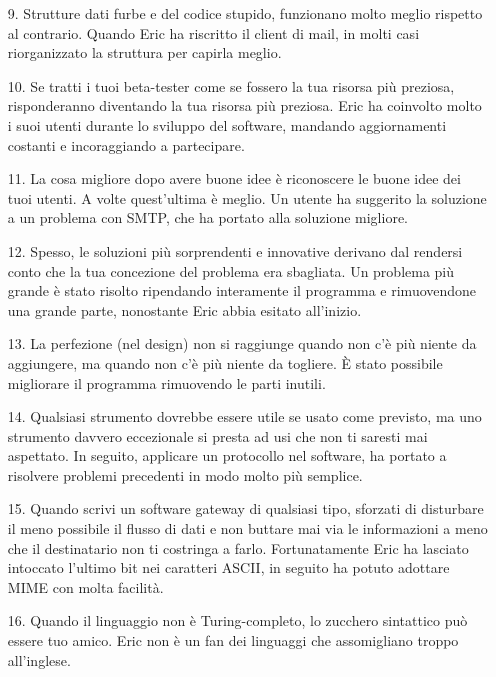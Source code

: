 \documentclass[a4paper,12pt,titlepage,oneside]{book}
\begin{document}
\begin{itemize}
    \item[9.] Strutture dati furbe e del codice stupido, funzionano molto meglio rispetto al contrario.
    Quando Eric ha riscritto il client di mail, in molti casi riorganizzato la struttura per capirla meglio.

    \item[10.] Se tratti i tuoi beta-tester come se fossero la tua risorsa più preziosa, risponderanno diventando la tua risorsa più preziosa.
    Eric ha coinvolto molto i suoi utenti durante lo sviluppo del software, mandando aggiornamenti costanti e incoraggiando a partecipare.

    \item[11.] La cosa migliore dopo avere buone idee è riconoscere le buone idee dei tuoi utenti. A volte quest'ultima è meglio.
    Un utente ha suggerito la soluzione a un problema con SMTP, che ha portato alla soluzione migliore.

    \item[12.] Spesso, le soluzioni più sorprendenti e innovative derivano dal rendersi conto che la tua concezione del problema era sbagliata.
    Un problema più grande è stato risolto ripendando interamente il programma e rimuovendone una grande parte, nonostante Eric abbia esitato all'inizio.

    \item[13.] La perfezione (nel design) non si raggiunge quando non c'è più niente da aggiungere, ma quando non c'è più niente da togliere.
    È stato possibile migliorare il programma rimuovendo le parti inutili.

    \item[14.] Qualsiasi strumento dovrebbe essere utile se usato come previsto, ma uno strumento davvero eccezionale si presta ad usi che non ti saresti mai aspettato.
    In seguito, applicare un protocollo nel software, ha portato a risolvere problemi precedenti in modo molto più semplice.

    \item[15.] Quando scrivi un software gateway di qualsiasi tipo, sforzati di disturbare il meno possibile il flusso di dati e non buttare mai via le informazioni a meno che il destinatario non ti costringa a farlo.
    Fortunatamente Eric ha lasciato intoccato l'ultimo bit nei caratteri ASCII, in seguito ha potuto adottare MIME con molta facilità.

    \item[16.] Quando il linguaggio non è Turing-completo, lo zucchero sintattico può essere tuo amico.
    Eric non è un fan dei linguaggi che assomigliano troppo all'inglese.


\end{itemize}
\end{document}
